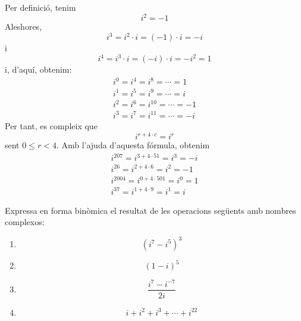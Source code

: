 \begin{solucio}
Per definició, tenim
\begin{equation*}
i^{2}=-1
\end{equation*}
Aleshores,
\begin{equation*}
i^{3}=i^{2}\cdot i=(-1)\cdot i=-i
\end{equation*}
i
\begin{equation*}
i^{4}=i^{3}\cdot i=(-i)\cdot i=-i^{2}=1
\end{equation*}
i, d’aquí, obtenim:
\begin{equation*}
\begin{array}{l}
i^{0}=i^{4}=i^{8}=\cdots =1 \\
i^{1}=i^{5}=i^{9}=\cdots =i \\
i^{2}=i^{6}=i^{10}=\cdots =-1 \\
i^{3}=i^{7}=i^{11}=\cdots =-i
\end{array}
\end{equation*}
Per tant, es compleix que
\begin{equation*}
i^{r+4\cdot c}=i^{r}
\end{equation*}
sent $0\leq r<4$. Amb l’ajuda d’aquesta fórmula, obtenim
\begin{equation*}
\begin{array}{l}
i^{207}=i^{3+4\cdot 51}=i^{3}=-i \\
i^{26}=i^{2+4\cdot 6}=i^{2}=-1 \\
i^{2004}=i^{0+4\cdot 501}=i^{0}=1 \\
i^{37}=i^{1+4\cdot 9}=i^{1}=i
\end{array}
\end{equation*}
\end{solucio}

\begin{exemple}
Expressa en forma binòmica el resultat de les operacions següents amb
nombres complexos:

\begin{enumerate}
\item[a)]
\begin{equation*}
(i^{7}-i^{5})^{3}
\end{equation*}

\item[b)]
\begin{equation*}
(1-i)^{5}
\end{equation*}

\item[c)]
\begin{equation*}
\frac{i^{7}-i^{-7}}{2i}
\end{equation*}

\item[d)]
\begin{equation*}
i+i^{2}+i^{3}+\cdots +i^{22}
\end{equation*}
\end{enumerate}
\end{exemple}

